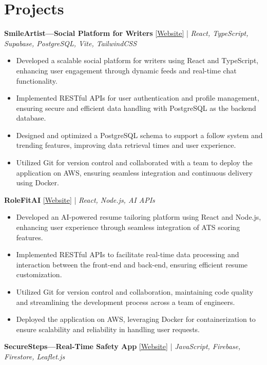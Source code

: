 \documentclass[10pt,a4paper]{article}
\begin{document}
\section{Projects}
\textbf{SmileArtist—Social Platform for Writers} \hfill \href{https://app.smileartist.org}{[Website]} | \textit{React, TypeScript, Supabase, PostgreSQL, Vite, TailwindCSS} \\
\begin{itemize}[leftmargin=*,itemsep=0pt]
  \item {Developed a scalable social platform for writers using React and TypeScript, enhancing user engagement through dynamic feeds and real-time chat functionality.}
  \item {Implemented RESTful APIs for user authentication and profile management, ensuring secure and efficient data handling with PostgreSQL as the backend database.}
  \item {Designed and optimized a PostgreSQL schema to support a follow system and trending features, improving data retrieval times and user experience.}
  \item {Utilized Git for version control and collaborated with a team to deploy the application on AWS, ensuring seamless integration and continuous delivery using Docker.}
\end{itemize}
\vspace{2pt}
\textbf{RoleFitAI} \hfill \href{https://rolefitai.smileartist.org}{[Website]} | \textit{React, Node.js, AI APIs} \\
\begin{itemize}[leftmargin=*,itemsep=0pt]
  \item {Developed an AI-powered resume tailoring platform using React and Node.js, enhancing user experience through seamless integration of ATS scoring features.}
  \item {Implemented RESTful APIs to facilitate real-time data processing and interaction between the front-end and back-end, ensuring efficient resume customization.}
  \item {Utilized Git for version control and collaboration, maintaining code quality and streamlining the development process across a team of engineers.}
  \item {Deployed the application on AWS, leveraging Docker for containerization to ensure scalability and reliability in handling user requests.}
\end{itemize}
\vspace{2pt}
\textbf{SecureSteps—Real-Time Safety App} \hfill \href{https://securesteps.smileartist.org}{[Website]} | \textit{JavaScript, Firebase, Firestore, Leaflet.js} \\
\end{document}
